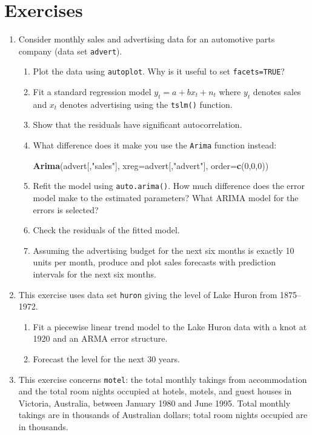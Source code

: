 \documentclass[]{book}
\newenvironment{Shaded}{\begin{snugshade}}{\end{snugshade}}
\newcommand{\DataTypeTok}[1]{\textcolor[rgb]{0.13,0.29,0.53}{#1}}
\newcommand{\DecValTok}[1]{\textcolor[rgb]{0.00,0.00,0.81}{#1}}
\newcommand{\KeywordTok}[1]{\textcolor[rgb]{0.13,0.29,0.53}{\textbf{#1}}}
\newcommand{\NormalTok}[1]{#1}
\newcommand{\StringTok}[1]{\textcolor[rgb]{0.31,0.60,0.02}{#1}}
\providecommand{\tightlist}{%
  \setlength{\itemsep}{0pt}\setlength{\parskip}{0pt}}
\begin{document}
\hypertarget{exercises-3}{%
\section{Exercises}\label{exercises-3}}

\begin{enumerate}
\def\labelenumi{\arabic{enumi}.}
\item
  Consider monthly sales and advertising data for an automotive parts company (data set \texttt{advert}).

  \begin{enumerate}
  \def\labelenumii{\alph{enumii}.}
  \item
    Plot the data using \texttt{autoplot}. Why is it useful to set \texttt{facets=TRUE}?
  \item
    Fit a standard regression model \(y_t = a + b x_t + n_t\) where \(y_t\) denotes sales and \(x_t\) denotes advertising using the \texttt{tslm()} function.
  \item
    Show that the residuals have significant autocorrelation.
  \item
    What difference does it make you use the \verb|Arima| function instead:

\begin{Shaded}
\begin{Highlighting}[]
\KeywordTok{Arima}\NormalTok{(advert[,}\StringTok{"sales"}\NormalTok{], }\DataTypeTok{xreg=}\NormalTok{advert[,}\StringTok{"advert"}\NormalTok{], }\DataTypeTok{order=}\KeywordTok{c}\NormalTok{(}\DecValTok{0}\NormalTok{,}\DecValTok{0}\NormalTok{,}\DecValTok{0}\NormalTok{))}
\end{Highlighting}
\end{Shaded}
  \item
    Refit the model using \texttt{auto.arima()}. How much difference does the error model make to the estimated parameters? What ARIMA model for the errors is selected?
  \item
    Check the residuals of the fitted model.
  \item
    Assuming the advertising budget for the next six months is exactly 10 units per month, produce and plot sales forecasts with prediction intervals for the next six months.
  \end{enumerate}
\item
  This exercise uses data set \texttt{huron} giving the level of Lake Huron from 1875--1972.

  \begin{enumerate}
  \def\labelenumii{\alph{enumii}.}
  \tightlist
  \item
    Fit a piecewise linear trend model to the Lake Huron data with a knot at 1920 and an ARMA error structure.
  \item
    Forecast the level for the next 30 years.
  \end{enumerate}
\item
  This exercise concerns \texttt{motel}: the total monthly takings from accommodation and the total room nights occupied at hotels, motels, and guest houses in Victoria, Australia, between January 1980 and June 1995. Total monthly takings are in thousands of Australian dollars; total room nights occupied are in thousands.


\end{enumerate}
\end{document}
